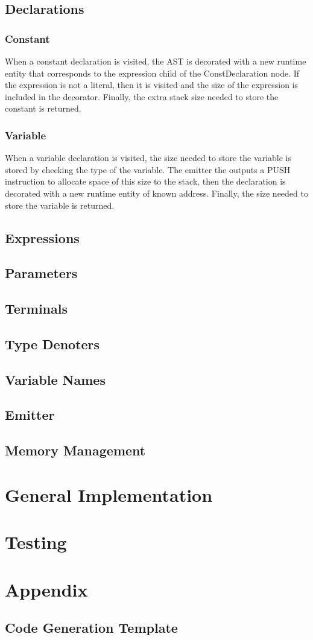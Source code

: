 \documentclass{article}
\begin{document}
\subsection{Declarations}
\subsubsection{Constant}
When a constant declaration is visited, the AST is decorated with a new runtime entity that corresponds to the expression child of the ConstDeclaration node. If the expression is not a literal, then it is visited and the size of the expression is included in the decorator. Finally, the extra stack size needed to store the constant is returned.

\subsubsection{Variable}
When a variable declaration is visited, the size needed to store the variable is stored by checking the type of the variable. The emitter the outputs a PUSH instruction to allocate space of this size to the stack, then the declaration is decorated with a new runtime entity of known address. Finally, the size needed to store the variable is returned.

\subsection{Expressions}
\subsection{Parameters}
\subsection{Terminals}
\subsection{Type Denoters}
\subsection{Variable Names}

\subsection{Emitter}
\subsection{Memory Management}





\section{General Implementation}
\section{Testing}
\section{Appendix}
\subsection*{Code Generation Template}
\end{document}

